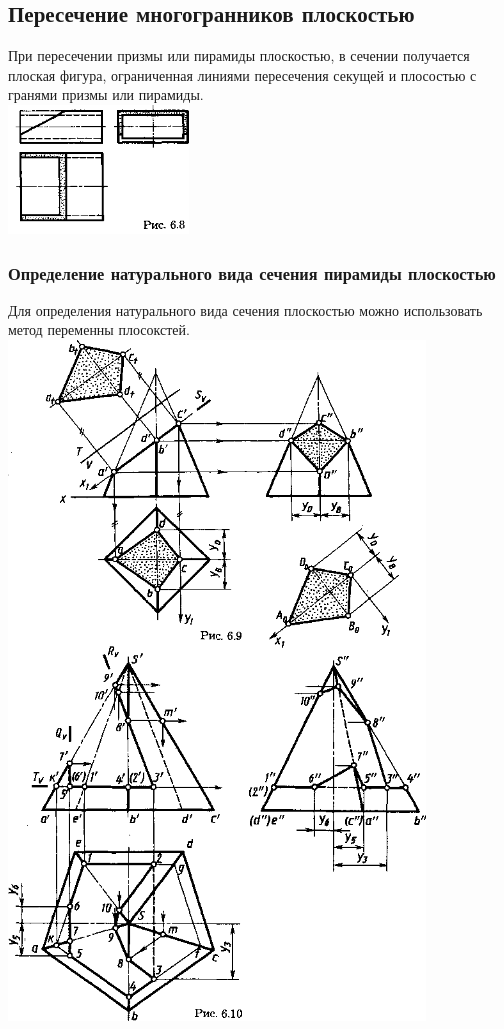 \documentclass[a4paper, 12pt]{article}
\begin{document}
\subsection{Пересечение многогранников плоскостью}

При пересечении призмы или пирамиды плоскостью, в сечении получается плоская фигура, ограниченная линиями пересечения секущей и плосостью с гранями призмы или пирамиды.\\
\includegraphics{img/641.png}\\
\subsubsection*{Определение натурального вида сечения пирамиды плоскостью}
Для определения натурального вида сечения плоскостью можно использовать метод переменны плосокстей.\\
\includegraphics{img/642.png}\\
\end{document}
